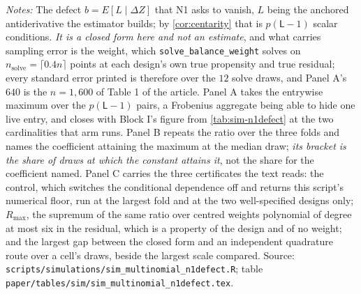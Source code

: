 \documentclass[
  12pt]{article}
\newcommand{\1}[1]{\mathds{1}\left[#1\right]}
\theoremstyle{plain}
\theoremstyle{definition}
\theoremstyle{definition}
\theoremstyle{remark}
\begin{document}
\begin{table}[p]
\centering
\begin{threeparttable}
\caption{N1 at the weight the engine solves for, on three multinomial designs}
\label{tab:sim-multinomial-n1defect}
\scriptsize
\setlength{\tabcolsep}{4pt}
\renewcommand{\arraystretch}{0.95}

\begin{tablenotes}\footnotesize
\item \textit{Notes:} The defect $b=E[L\mid\Delta Z]$ that N1 asks to vanish, $L$
being the anchored antiderivative the estimator builds; by \cref{cor:centarity}
that is $p(\mathsf L-1)$ scalar conditions. \emph{It is a closed form here and not
an estimate}, and what carries sampling error is the weight, which
\texttt{solve\_balance\_weight} solves on $n_{\mathrm{solve}}=\lceil0.4n\rceil$
points at each design's own true propensity and true residual; every standard
error printed is therefore over the $12$ solve draws, and Panel A's $640$ is the
$n=1{,}600$ of Table 1 of the article. Panel A takes the entrywise
maximum over the $p(\mathsf L-1)$ pairs, a Frobenius aggregate being able to hide
one live entry, and closes with Block I's figure from \cref{tab:sim-n1defect} at
the two cardinalities that arm runs. Panel B repeats the ratio over the three
folds and names the coefficient attaining the maximum at the median draw;
\emph{its bracket is the share of draws at which the constant attains it}, not
the share for the coefficient named. Panel C carries the three certificates the
text reads: the control, which switches the conditional dependence off and
returns this script's numerical floor, run at the largest fold and at the two
well-specified designs only; $R_{\max}$, the supremum of the same ratio over
centred weights polynomial of degree at most six in the residual, which is a
property of the design and of no weight; and the largest gap between the closed
form and an independent quadrature route over a cell's draws, beside the largest
scale compared. Source:
\texttt{scripts/simulations/sim\_multinomial\_n1defect.R}; table
\texttt{paper/tables/sim/sim\_multinomial\_n1defect.tex}.
\end{tablenotes}
\end{threeparttable}
\end{table}
\end{document}
